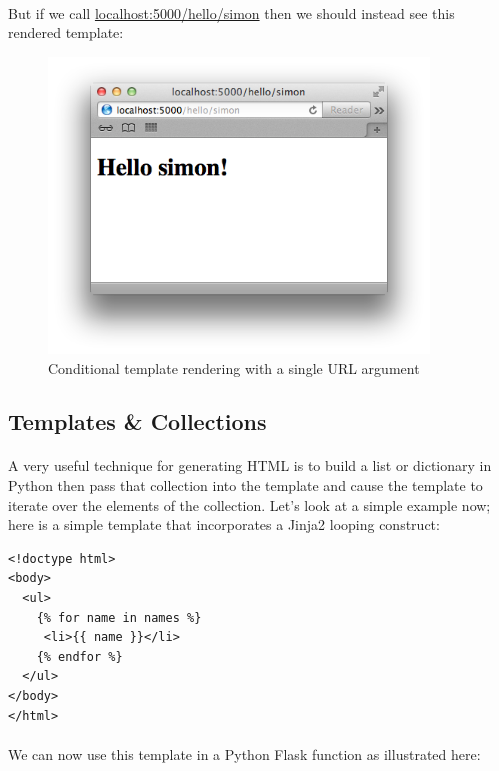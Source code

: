 \documentclass[12pt, a4paper, twoside]{book}
\begin{document}
\paragraph{} But if we call \url{localhost:5000/hello/simon} then we should instead see this rendered template:

\begin{figure}[H]
\centering
\includegraphics[width=0.9\textwidth]{images/flask-template-conditional-arg}
\caption{Conditional template rendering with a single URL argument}
\label{fig:flask-template-conditional-arg}
\end{figure}


\subsection{Templates \& Collections}
\label{templates-collections}
\paragraph{} A very useful technique for generating HTML is to build a list or dictionary in Python then pass that collection into the template and cause the template to iterate over the elements of the collection. Let's look at a simple example now; here is a simple template that incorporates a Jinja2 looping construct:

\begin{lstlisting}
<!doctype html>
<body>
  <ul>
    {% for name in names %}
     <li>{{ name }}</li>
    {% endfor %}
  </ul>
</body>
</html>
\end{lstlisting}

\paragraph{} We can now use this template in a Python Flask function as illustrated here:
\end{document}
